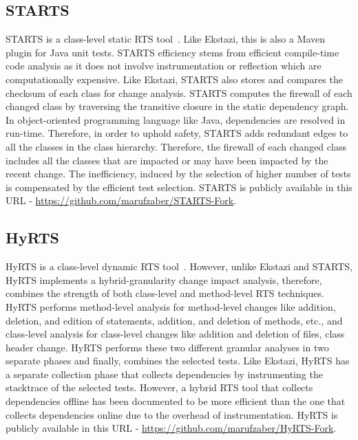 \subsection{STARTS}

STARTS is a class-level static RTS tool~\cite{starts}. Like Ekstazi, this is also a Maven plugin for Java unit tests. STARTS efficiency stems from efficient compile-time code analysis as it does not involve instrumentation or reflection which are computationally expensive. Like Ekstazi, STARTS also stores and compares the checksum of each class for change analysis. STARTS computes the firewall of each changed class by traversing the transitive closure in the static dependency graph. In object-oriented programming language like Java, dependencies are resolved in run-time. Therefore, in order to uphold safety, STARTS adds redundant edges to all the classes in the class hierarchy. Therefore, the firewall of each changed class includes all the classes that are impacted or may have been impacted by the recent change. The inefficiency, induced by the selection of higher number of tests is compensated by the efficient test selection. STARTS is publicly available in this URL - \href{url}{https://github.com/marufzaber/STARTS-Fork}.

\subsection{HyRTS}
HyRTS is a class-level dynamic RTS tool~\cite{hyrts}. However, unlike Ekstazi and STARTS, HyRTS implements a hybrid-granularity change impact analysis, therefore, combines the strength of both class-level and method-level RTS techniques. HyRTS performs method-level analysis for method-level changes like addition, deletion, and edition of statements, addition, and deletion of methods, etc., and class-level analysis for class-level changes like addition and deletion of files, class header change. HyRTS performs these two different granular analyses in two separate phases and finally, combines the selected tests. Like Ekstazi, HyRTS has a separate collection phase that collects dependencies by instrumenting the stacktrace of the selected tests. However, a hybrid RTS tool that collects dependencies offline has been documented to be more efficient than the one that collects dependencies online due to the overhead of instrumentation. HyRTS is publicly available in this URL - \href{url}{https://github.com/marufzaber/HyRTS-Fork}.
